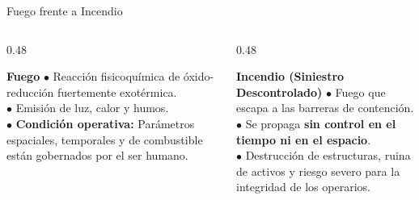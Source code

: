 
\begin{frame}{Fuego frente a Incendio}
  \begin{columns}[T]
    \begin{column}{0.48\textwidth}
      \begin{block}{\textbf{Fuego}}
        \small
        $\bullet$ Reacción fisicoquímica de óxido-reducción fuertemente exotérmica.\\
        $\bullet$ Emisión de luz, calor y humos.\\
        $\bullet$ \textbf{Condición operativa:} Parámetros espaciales, temporales y de combustible están gobernados por el ser humano.
      \end{block}
      \vspace{0.2cm}
      \centering
    \end{column}

    \begin{column}{0.48\textwidth}
      \begin{alertblock}{\textbf{Incendio (Siniestro Descontrolado)}}
        \small
        $\bullet$ Fuego que escapa a las barreras de contención.\\
        $\bullet$ Se propaga \textbf{sin control en el tiempo ni en el espacio}.\\
        $\bullet$ Destrucción de estructuras, ruina de activos y riesgo severo para la integridad de los operarios.
      \end{alertblock}
      \vspace{0.2cm}
      \centering
    \end{column}
  \end{columns}
\end{frame}

